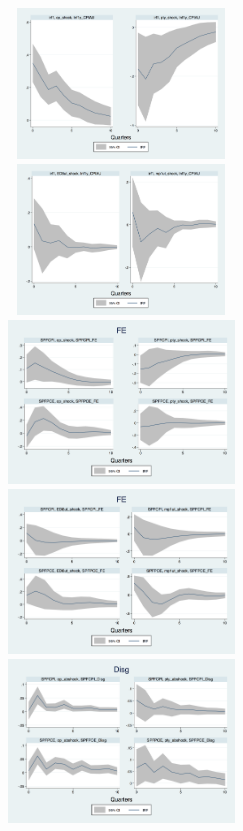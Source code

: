 \documentclass[]{article}
\begin{document}
\begin{figure}[ht]
	\centering
	\includegraphics[width=6cm,height=4cm]{figures/CPIAU_ashocks_nmp.png}  
	\includegraphics[width=6cm,height=4cm]{figures/CPIAU_ashocks.png} \\
	\smallskip
	\includegraphics[width=6cm]{figures/SPFFE_ashocks_nmp.png} 
		\includegraphics[width=6cm]{figures/SPFFE_ashocks.png} \\
	\smallskip
	\includegraphics[width=6cm]{figures/SPFDisg_ab_ashocks_nmp.png} 

\end{figure}
\end{document}
